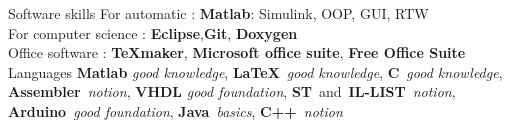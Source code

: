 \documentclass[11pt,a4paper,sans]{moderncv}        %
\begin{document}
\begin{samepage}
%		
%
\tripleitemiseavecTitre%
{Software skills}%
{{%
	For automatic : {\small \textbf{Matlab}: Simulink, OOP, GUI, RTW}\\ %
	For computer science : {\small \textbf{Eclipse},\textbf{Git}, \textbf{Doxygen}}\\%
	Office software : {\small \textbf{\TeX maker}, \textbf{Microsoft office suite}, \textbf{Free Office Suite}}%
}}%
{Languages}%
{%
	\textbf{Matlab} \textit{good knowledge}, \textbf{\LaTeX}~\textit{good knowledge}, \textbf{C}~\textit{good knowledge}, 	\textbf{Assembler}~\textit{notion}, \textbf{VHDL} \textit{good foundation}, \textbf{ST}~and~\textbf{IL-LIST}~\textit{notion}, \textbf{Arduino}~\textit{good foundation}, \textbf{Java}~\textit{basics}, \textbf{C++}~\textit{notion}%
}
\end{samepage}
\end{document}
